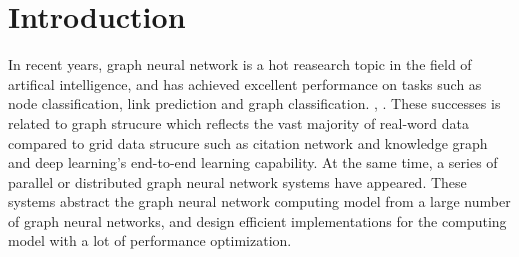 \section{Introduction}

In recent years, graph neural network is a hot reasearch topic in the field of artifical intelligence, 
and has achieved excellent performance on tasks such as node classification, link prediction and graph classification.\cite{comprehensive-survey-wu-2020}
\cite{zhou2018_gnn_review}, \cite{zhang2018_gnn_survey}. These successes is related to graph strucure which reflects the vast majority of real-word data compared
to grid data strucure such as citation network and knowledge graph and deep learning's end-to-end learning capability.
At the same time, a series of parallel or distributed graph neural network systems have appeared.  
These systems abstract the graph neural network computing model from a large number of graph neural networks,
and design efficient implementations for the computing model with a lot of performance optimization.

